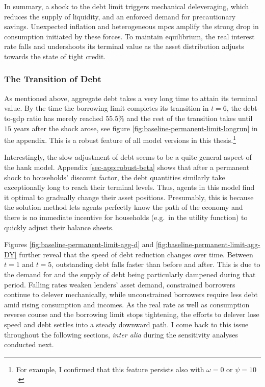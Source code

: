\documentclass[a4paper,12pt]{article} %
\numberwithin{equation}{section} %
\numberwithin{figure}{section}
\numberwithin{table}{section}
\begin{document}
In summary, a shock to the debt limit triggers mechanical deleveraging, which reduces the supply of liquidity, and an enforced demand for precautionary savings. Unexpected inflation and heterogeneous \Gls{mpc}s amplify the strong drop in consumption initiated by these forces. To maintain equilibrium, the real interest rate falls and undershoots its terminal value as the asset distribution adjusts towards the state of tight credit.

\subsubsection{The Transition of Debt}
\label{sec:limit-transition-debt}

As mentioned above, aggregate debt takes a very long time to attain its terminal value. By the time the borrowing limit completes its transition in $t=6$, the debt-to-\Gls{gdp} ratio has merely reached $55.5\%$ and the rest of the transition takes until $15$ years after the shock arose, see figure \ref{fig:baseline-permanent-limit-longrun} in the appendix. This is a robust feature of all model versions in this thesis.\footnote{For example, I confirmed that this feature persists also with $\omega = 0$ or $\psi = 10$.}

Interestingly, the slow adjustment of debt seems to be a quite general aspect of the \Gls{hank} model. Appendix \ref{sec-app:robust-beta} shows that after a permanent shock to households' discount factor, the debt quantities similarly take exceptionally long to reach their terminal levels. Thus, agents in this model find it optimal to gradually change their asset positions. Presumably, this is because the solution method lets agents perfectly know the path of the economy and there is no immediate incentive for households (e.g.~in the utility function) to quickly adjust their balance sheets.

Figures \ref{fig:baseline-permanent-limit-agg-d} and \ref{fig:baseline-permanent-limit-agg-DY} further reveal that the speed of debt reduction changes over time. Between $t=1$ and $t=5$, outstanding debt falls faster than before and after. This is due to the demand for and the supply of debt being particularly dampened during that period. Falling rates weaken lenders' asset demand, constrained borrowers continue to delever mechanically, while unconstrained borrowers require less debt amid rising consumption and incomes. As the real rate as well as consumption reverse course and the borrowing limit stops tightening, the efforts to delever lose speed and debt settles into a steady downward path. I come back to this issue throughout the following sections, \textit{inter alia} during the sensitivity analyses conducted next.
\end{document}
